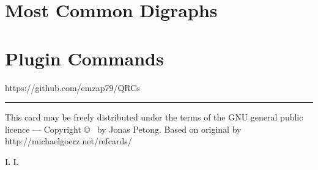 \section{Most Common Digraphs}{}

\section{Plugin Commands}{}

\vfill
{\smalltt https://github.com/emzap79/QRCs}
\hrule
\smallskip
{\smallrm This card may be freely distributed under
    the terms of the GNU general public licence ---
        Copyright \copyright\ {} by Jonas Petong.
        Based on original by {\smalltt http://michaelgoerz.net/refcards/}
}

\vfil
\supereject
\if L\lr \else\null\vfill\eject\fi
\if L\lr \else\null\vfill\eject\fi
\bye

